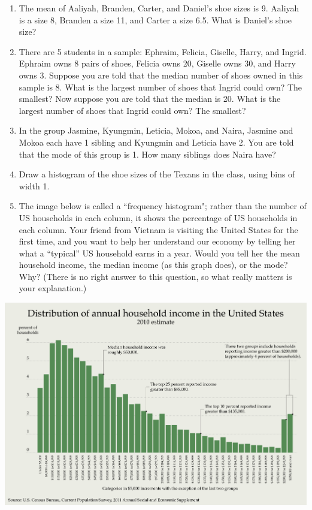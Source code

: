 \documentclass[12pt]{article}
\begin{document}
\begin{enumerate}
	\item The mean of Aaliyah, Branden, Carter, and Daniel's shoe sizes is 9. Aaliyah is a size 8, Branden a size 11, and Carter a size 6.5. What is Daniel's shoe size?
	\item There are 5 students in a sample: Ephraim, Felicia, Giselle, Harry, and Ingrid. Ephraim owns 8 pairs of shoes, Felicia owns 20, Giselle owns 30, and Harry owns 3. Suppose you are told that the median number of shoes owned in this sample is 8. What is the largest number of shoes that Ingrid could own? The smallest? Now suppose you are told that the median is 20. What is the largest number of shoes that Ingrid could own? The smallest?
	\item In the group Jasmine, Kyungmin, Leticia, Mokoa, and Naira, Jasmine and Mokoa each have 1 sibling and Kyungmin and Leticia have 2. You are told that the mode of this group is 1. How many siblings does Naira have?
	\item Draw a histogram of the shoe sizes of the Texans in the class, using bins of width 1.
	\item The image below is called a ``frequency histogram"; rather than the number of US households in each column, it shows the percentage of US households in each column. Your friend from Vietnam is visiting the United States for the first time, and you want to help her understand our economy by telling her what a ``typical'' US household earns in a year. Would you tell her the mean household income, the median income (as this graph does), or the mode? Why? (There is no right answer to this question, so what really matters is your explanation.)
\end{enumerate}
\centering
\includegraphics[scale=0.5]{income}
\end{document}
